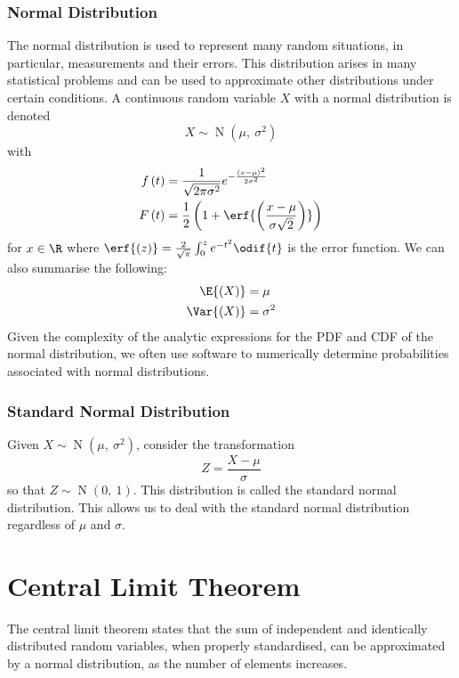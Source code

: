 \documentclass{article}
\begin{document}
\subsubsection{Normal Distribution}
The normal distribution is used to represent many random situations, in
particular, measurements and their errors. This distribution arises in
many statistical problems and can be used to approximate other
distributions under certain conditions. A continuous random variable
\(X\) with a normal distribution is denoted
\begin{equation*}
    X \sim \operatorname{N}{\left( \mu,\: \sigma^2 \right)}
\end{equation*}
with
\begin{align*}
    f\left( t \right) & = \frac{1}{\sqrt{2 \pi \sigma^2}} e^{-\frac{\left( x - \mu \right)^2}{2 \sigma^2}}    \\
    F\left( t \right) & = \frac{1}{2} \left( 1 + \erf{\left( \frac{x - \mu}{\sigma \sqrt{2}} \right)} \right)
\end{align*}
for \(x \in \R\) where \(\erf{\left( z \right)} = \frac{2}{\sqrt{\pi}} \int_0^z e^{-t^2} \odif{t}\) is the error function.
We can also summarise the following:
\begin{align*}
    \E{\left( X \right)}   & = \mu      \\
    \Var{\left( X \right)} & = \sigma^2
\end{align*}
Given the complexity of the analytic expressions for the PDF and CDF of the normal distribution, we often
use software to numerically determine probabilities associated with normal distributions.
\subsubsection{Standard Normal Distribution}
Given \(X \sim \operatorname{N}{\left( \mu,\: \sigma^2 \right)}\),
consider the transformation
\begin{equation*}
    Z = \frac{X - \mu}{\sigma}
\end{equation*}
so that \(Z \sim \operatorname{N}{\left( 0,\: 1 \right)}\). This distribution is called the standard normal distribution.
This allows us to deal with the standard normal distribution regardless of \(\mu\) and \(\sigma\).
\section{Central Limit Theorem}
The central limit theorem states that the sum of independent and
identically distributed random variables, when properly standardised,
can be approximated by a normal distribution, as the number of elements
increases.
\end{document}
